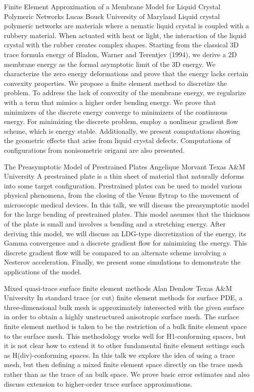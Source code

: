 \vspace{1.5ex}
\abs
{Finite Element Approximation of a Membrane Model for Liquid Crystal Polymeric Networks}
{Lucas Bouck}
{University of Maryland}
{Liquid crystal polymeric networks are materials where a nematic liquid crystal is coupled with a rubbery material. When actuated with heat or light, the interaction of the liquid crystal with the rubber creates complex shapes. Starting from the classical 3D trace formula energy of Bladon, Warner and Terentjev (1994), we derive a 2D membrane energy as the formal asymptotic limit of the 3D energy. We characterize the zero energy deformations and prove that the energy lacks certain convexity properties. We propose a finite element method to discretize the problem. To address the lack of convexity of the membrane energy, we regularize with a term that mimics a higher order bending energy. We prove that minimizers of the discrete energy converge to minimizers of the continuous energy. For minimizing the discrete problem, employ a nonlinear gradient flow scheme, which is energy stable. Additionally, we present computations showing the geometric effects that arise from liquid crystal defects. Computations of configurations from nonisometric origami are also presented.
}


\vspace{1.5ex}
\abs
{The Preasymptotic Model of Prestrained Plates}
{Angelique Morvant}
{Texas A\&M University}
{A prestrained plate is a thin sheet of material that naturally deforms into some target configuration. Prestrained plates can be used to model various physical phenomena, from the closing of the Venus flytrap to the movement of microscopic medical devices. In this talk, we will discuss the preasymptotic model for the large bending of prestrained plates. This model assumes that the thickness of the plate is small and involves a bending and a stretching energy. After deriving this model, we will discuss an LDG-type discretization of the energy, its Gamma convergence and a discrete gradient flow for minimizing the energy. This discrete gradient flow will be compared to an alternate scheme involving a Nesterov acceleration. Finally, we present some simulations to demonstrate the applications of the model.}


\vspace{1.5ex}
\abs
{Mixed quasi-trace surface finite element methods}
{Alan Demlow}
{Texas A\&M University}
{In standard trace (or cut) finite element methods for surface PDE, a three-dimensional bulk mesh is approximately intersected with the given surface in order to obtain a highly unstructured anisotropic surface mesh. The surface finite element method is taken to be the restriction of a bulk finite element space to the surface mesh. This methodology works well for H1-conforming spaces, but it is not clear how to extend it to other fundamental finite element settings such as H(div)-conforming spaces. In this talk we explore the idea of using a trace mesh, but then defining a mixed finite element space directly on the trace mesh rather than as the trace of an bulk space. We prove basic error estimates and also discuss extension to higher-order trace surface approximations.}


